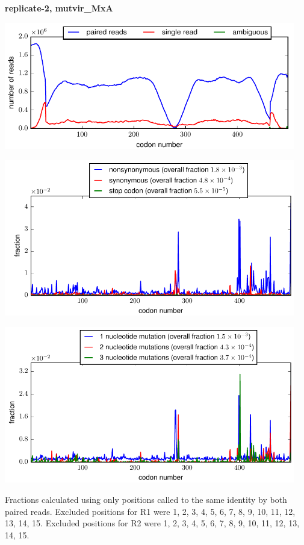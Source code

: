 \documentclass[10pt,letterpaper]{article}
\begin{document}
\centerline{\Large \bf replicate-2, mutvir\_MxA}
\vspace{0.1in}

\centerline{\includegraphics[width=5in]{replicate-2-mutvir_MxA_codondepth.pdf}}
\vspace{0.1in}

\centerline{\includegraphics[width=5in]{replicate-2-mutvir_MxA_syn-ns-dist.pdf}}
\vspace{0.1in}

\centerline{\includegraphics[width=5in]{replicate-2-mutvir_MxA_nmutspercodon-dist.pdf}}
\vspace{0.1in}

Fractions calculated using only positions called to the same identity by both paired reads.  Excluded positions for R1 were 1, 2, 3, 4, 5, 6, 7, 8, 9, 10, 11, 12, 13, 14, 15. 
 Excluded positions for R2 were 1, 2, 3, 4, 5, 6, 7, 8, 9, 10, 11, 12, 13, 14, 15. 
\end{document}
